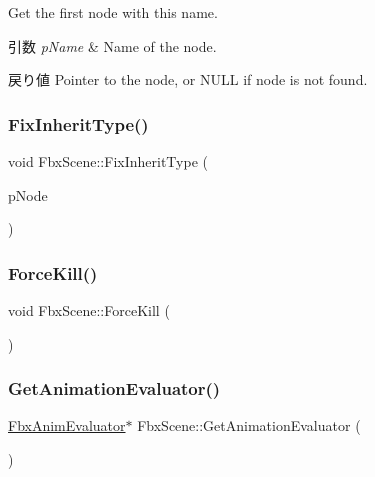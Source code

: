 Get the first node with this name. 
\begin{DoxyParams}{引数}
{\em p\+Name} & Name of the node. \\
\hline
\end{DoxyParams}
\begin{DoxyReturn}{戻り値}
Pointer to the node, or {\ttfamily N\+U\+LL} if node is not found. 
\end{DoxyReturn}
\mbox{\label{class_fbx_scene_acf98b8d5cee48e3e2301d25814378945}} 
\subsubsection{\texorpdfstring{Fix\+Inherit\+Type()}{FixInheritType()}}
{\footnotesize\ttfamily void Fbx\+Scene\+::\+Fix\+Inherit\+Type (\begin{DoxyParamCaption}\item[{\hyperlink{class_fbx_node}{Fbx\+Node} $\ast$}]{p\+Node }\end{DoxyParamCaption})}

\mbox{\label{class_fbx_scene_a12132b6491e03c381339492a36990b01}} 
\subsubsection{\texorpdfstring{Force\+Kill()}{ForceKill()}}
{\footnotesize\ttfamily void Fbx\+Scene\+::\+Force\+Kill (\begin{DoxyParamCaption}{ }\end{DoxyParamCaption})}

\mbox{\label{class_fbx_scene_a6938500794b26f33a0a56a1ea4ce4a61}} 
\subsubsection{\texorpdfstring{Get\+Animation\+Evaluator()}{GetAnimationEvaluator()}}
{\footnotesize\ttfamily \hyperlink{class_fbx_anim_evaluator}{Fbx\+Anim\+Evaluator}$\ast$ Fbx\+Scene\+::\+Get\+Animation\+Evaluator (\begin{DoxyParamCaption}{ }\end{DoxyParamCaption})}

